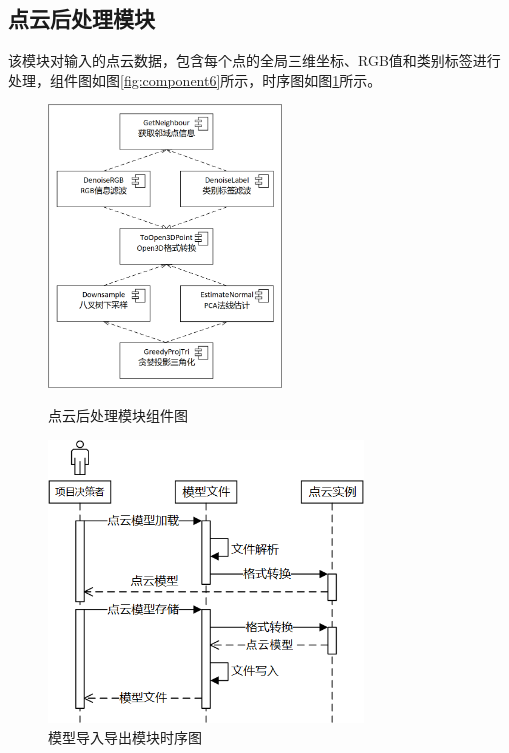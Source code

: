 \subsection{点云后处理模块}
\par 该模块对输入的点云数据，包含每个点的全局三维坐标、RGB值和类别标签进行处理，组件图如图\ref{fig:component6}所示，时序图如图\ref{fig:sequence7}所示。

\begin{figure}[htb]
	\centering
	\begin{minipage}[t]{0.42\textwidth}
		\centering
		\includegraphics[height=7.5cm,keepaspectratio]{figures/uml/component6.png}
		\caption{点云后处理模块组件图}
		\label{fig:component6}
	\end{minipage}
	\begin{minipage}[t]{0.53\textwidth}
		\centering
		\includegraphics[height=7.5cm,keepaspectratio]{figures/uml/sequence7.png}
		\caption{模型导入导出模块时序图}
		\label{fig:sequence7}
	\end{minipage}
\end{figure}

